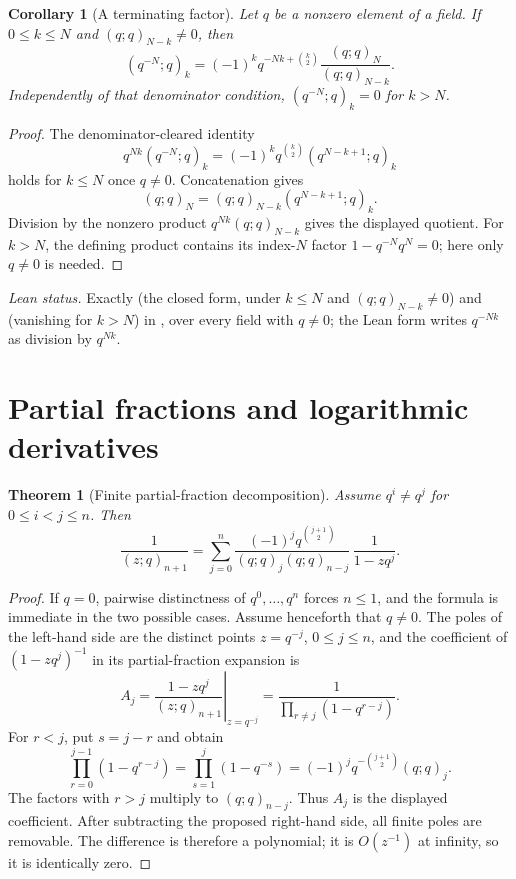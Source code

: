\documentclass[11pt,a4paper,oneside,openany]{book}
\newtheorem{theorem}{Theorem}[chapter]
\newtheorem{corollary}[corollary]{Corollary}
\theoremstyle{definition}
\theoremstyle{remark}
\begin{document}
\begin{corollary}[A terminating factor]\label{cor:qminusN}
Let $q$ be a nonzero element of a field.  If $0\le k\le N$ and
$(q;q)_{N-k}\ne0$, then
\[
 (q^{-N};q)_k=(-1)^kq^{-Nk+\binom k2}
 \frac{(q;q)_N}{(q;q)_{N-k}}.
\]
Independently of that denominator condition, $(q^{-N};q)_k=0$ for $k>N$.
\end{corollary}

\begin{proof}
The denominator-cleared identity
\[
 q^{Nk}(q^{-N};q)_k
 =(-1)^kq^{\binom k2}(q^{N-k+1};q)_k
\]
holds for $k\le N$ once $q\ne0$.  Concatenation gives
\[
 (q;q)_N=(q;q)_{N-k}(q^{N-k+1};q)_k.
\]
Division by the nonzero product $q^{Nk}(q;q)_{N-k}$ gives the displayed
quotient.  For $k>N$, the defining product contains its index-$N$ factor
$1-q^{-N}q^N=0$; here only $q\ne0$ is needed.
\end{proof}

\emph{Lean status.}  Exactly  (the
closed form, under $k\le N$ and $(q;q)_{N-k}\ne0$) and
 (vanishing for $k>N$) in
, over every field with $q\ne0$; the Lean form
writes $q^{-Nk}$ as division by $q^{Nk}$.


\section{Partial fractions and logarithmic derivatives}

\begin{theorem}[Finite partial-fraction decomposition]\label{thm:partial-fraction}
Assume $q^i\ne q^j$ for $0\le i<j\le n$.  Then
\[
 \frac{1}{(z;q)_{n+1}}
 =\sum_{j=0}^{n}
 \frac{(-1)^j q^{\binom{j+1}{2}}}
 {(q;q)_j(q;q)_{n-j}}\,
 \frac{1}{1-zq^j}.
\]
\end{theorem}

\begin{proof}
If $q=0$, pairwise distinctness of $q^0,\ldots,q^n$ forces $n\le1$, and the
formula is immediate in the two possible cases.  Assume henceforth that
$q\ne0$.  The poles of the left-hand side are the distinct points
$z=q^{-j}$, $0\le j\le n$, and the coefficient of $(1-zq^j)^{-1}$ in its
partial-fraction expansion is
\[
 A_j=\left.\frac{1-zq^j}{(z;q)_{n+1}}\right|_{z=q^{-j}}
 =\frac{1}{\prod_{r\ne j}(1-q^{r-j})}.
\]
For $r<j$, put $s=j-r$ and obtain
\[
 \prod_{r=0}^{j-1}(1-q^{r-j})
 =\prod_{s=1}^{j}(1-q^{-s})
 =(-1)^jq^{-\binom{j+1}{2}}(q;q)_j.
\]
The factors with $r>j$ multiply to $(q;q)_{n-j}$.  Thus $A_j$ is the
displayed coefficient.  After subtracting the proposed right-hand side, all
finite poles are removable.  The difference is therefore a polynomial; it is
$O(z^{-1})$ at infinity, so it is identically zero.
\end{proof}
\end{document}
